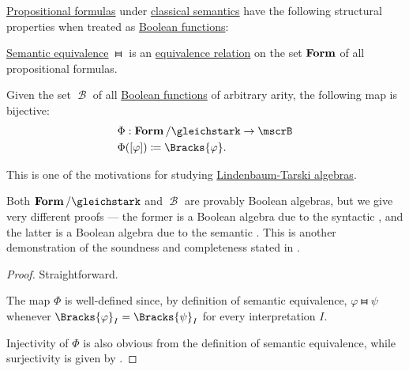 \begin{proposition}\label{thm:propositional_formulas_and_boolean_functions}
  \hyperref[def:propositional_syntax/formula]{Propositional formulas} under \hyperref[def:propositional_semantics]{classical semantics} have the following structural properties when treated as \hyperref[def:boolean_function]{Boolean functions}:

  \begin{thmenum}
     \hyperref[def:semantic_equivalence]{Semantic equivalence} \( \gleichstark \) is an \hyperref[def:equivalence_relation]{equivalence relation} on the set \( \op*{Form} \) of all propositional formulas.

     Given the set \( \mscrB \) of all \hyperref[def:boolean_function]{Boolean functions} of arbitrary arity, the following map is bijective:
    \begin{equation*}
      \begin{aligned}
        &\Phi: \op*{Form} / {\gleichstark} \to \mscrB \\
        &\Phi([\varphi]) \coloneqq \Bracks{\varphi}.
      \end{aligned}
    \end{equation*}
  \end{thmenum}
\end{proposition}
\begin{comments}
  \item This is one of the motivations for studying \hyperref[def:lindenbaum_tarski_algebra]{Lindenbaum-Tarski algebras}.
  \item Both \( \op*{Form} / {\gleichstark} \) and \( \mscrB \) are provably Boolean algebras, but we give very different proofs --- the former is a Boolean algebra due to the syntactic , and the latter is a Boolean algebra due to the semantic . This is another demonstration of the soundness and completeness stated in .
\end{comments}
\begin{proof}
   Straightforward.

   The map \( \Phi \) is well-defined since, by definition of semantic equivalence, \( \varphi \gleichstark \psi \) whenever \( \Bracks{\varphi}_I = \Bracks{\psi}_I \) for every interpretation \( I \).

  Injectivity of \( \Phi \) is also obvious from the definition of semantic equivalence, while surjectivity is given by .
\end{proof}
